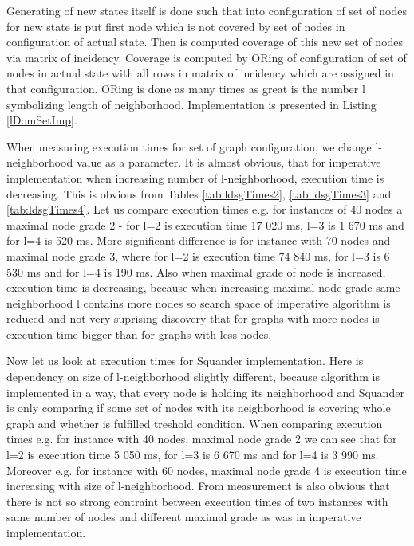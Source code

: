 \documentclass[11pt,twoside,a4paper]{book}
\begin{document}
Generating of new states itself is done such that into configuration of set of
nodes for new state is put first node which is not covered by set of nodes in
configuration of actual state. Then is computed coverage of this new set of
nodes via matrix of incidency. Coverage is computed by ORing of configuration of
set of nodes in actual state with all rows in matrix of incidency which are
assigned in that configuration. ORing is done as many times as great is the
number l symbolizing length of neighborhood. Implementation is presented in
Listing \ref{lDomSetImp}.
\newpage

\newpage
When measuring execution times for set of graph configuration, we change
l-neighborhood value as a parameter. It is almost obvious, that for imperative
implementation when increasing number of l-neighborhood, execution time is
decreasing. This is obvious from Tables \ref{tab:ldsgTimes2},
\ref{tab:ldsgTimes3} and \ref{tab:ldsgTimes4}. Let us compare execution
times e.g. for instances of 40 nodes a maximal node grade 2 - for l=2 is
execution time 17 020 ms, l=3 is 1 670 ms and for l=4 is 520 ms. More significant
difference is for instance with 70 nodes and maximal node grade 3, where for
l=2 is execution time 74 840 ms, for l=3 is 6 530 ms and for l=4 is 190 ms.
Also when maximal grade of node is increased, execution time is decreasing,
because when increasing maximal node grade same neighborhood l contains more
nodes so search space of imperative algorithm is reduced and not very suprising
discovery that for graphs with more nodes is execution time bigger than for
graphs with less nodes.

Now let us look at execution times for Squander implementation. Here is
dependency on size of l-neighborhood slightly different, because algorithm is
implemented in a way, that every node is holding its neighborhood and Squander
is only comparing if some set of nodes with its neighborhood is covering whole
graph and whether is fulfilled treshold condition. When comparing execution
times e.g. for instance with 40 nodes, maximal node grade 2 we can see that for
l=2 is execution time 5 050 ms, for l=3 is 6 670 ms and for l=4 is 3 990 ms.
Moreover e.g. for instance with 60 nodes, maximal node grade 4 is execution
time increasing with size of l-neighborhood. From measurement is also obvious
that there is not so strong contraint between execution times of two instances
with same number of nodes and different maximal grade as was in imperative
implementation.
\end{document}
